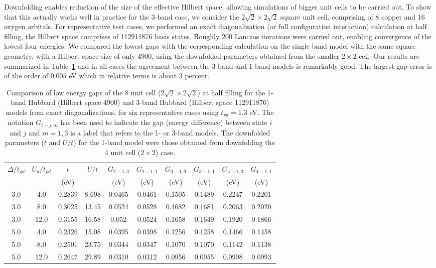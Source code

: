 Downfolding enables reduction of the size of the effective Hilbert space; allowing 
simulations of bigger unit cells to be carried out. To show that this actually works well in practice for the 3-band case, 
we consider the $2\sqrt{2} \times 2 \sqrt{2}$ square unit cell, comprising of 8 copper and 16 oxygen orbitals. 
For representative test cases, we performed an exact diagonalization 
(or full configuration interaction) calculation at half filling, the Hilbert space comprises of 112911876 basis states. 
Roughly 200 Lanczos iterations were carried out, enabling convergence of the lowest four energies. 
We compared the lowest gaps with the corresponding calculation on the single 
band model with the same square geometry, with a Hilbert space size of only 4900, 
using the downfolded parameters obtained from the smaller $2 \times 2$ cell. Our results are summarized 
in Table~\ref{tab:predictivity} and in all cases the agreement between the 3-band and 1-band models 
is remarkably good. The largest gap error is of the order of $0.005$ eV which in relative terms is 
about 3 percent. 

\begin{table}[ht]
\centering
\begin{tabular}{c|c|c|c||c|c||c|c||c|c}
\hline
$\Delta/t_{pd}$ & $U_d/t_{pd}$ & $t$ & $U/t$ & $G_{2-1,3}$ & $G_{2-1,1}$ & $G_{3-1,3}$ & $G_{3-1,1}$ & $G_{4-1,3}$ & $G_{4-1,1}$  \\
                &              & (eV)&       & (eV)        & (eV)        & (eV)        & (eV)        & (eV)        & (eV)         \\
\hline
\hline
3.0 & 4.0 &  0.2839 & 8.698 & 0.0465 & 0.0461 & 0.1505 & 0.1489 & 0.2247 & 0.2201  \\ 
3.0 & 8.0 &  0.3025 & 13.45 & 0.0524 & 0.0528 & 0.1682 & 0.1681 & 0.2063 & 0.2020  \\ 
3.0 & 12.0 & 0.3155 & 16.58 & 0.052 & 0.0524 & 0.1658 & 0.1649 & 0.1920 & 0.1866  \\ 
5.0 & 4.0 &  0.2326 & 15.08 & 0.0395 & 0.0398 & 0.1256 & 0.1258 & 0.1466 & 0.1458  \\ 
5.0 & 8.0 &  0.2501 & 23.75 & 0.0344 & 0.0347 & 0.1070 & 0.1070 & 0.1142 & 0.1138  \\ 
5.0 & 12.0 & 0.2647 &29.89 & 0.0310 & 0.0312 & 0.0956 & 0.0955 & 0.0998 & 0.0993  \\ 
\hline
\end{tabular}
\caption{Comparison of low energy gaps of the 8 unit cell ($2\sqrt{2} \times 2\sqrt{2}$) at half filling for the 
1-band Hubbard (Hilbert space 4900) and 3-band Hubbard (Hilbert space 112911876) 
models from exact diagonalizations, for six representative cases using $t_{pd}=1.3 $ eV. The notation $G_{i-j,m}$ 
has been used to indicate the gap (energy difference) between state $i$ and $j$ and $m=1,3$ is a label that 
refers to the 1- or 3-band models. 
The downfolded parameters ($t$ and $U/t$) 
for the 1-band model were those obtained from downfolding the 4 unit cell ($2\times2$) case.}
\label{tab:predictivity}
\end{table} 



